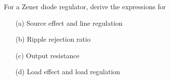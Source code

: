 
\begin{example}\label{exam2.34}
For a Zener diode regulator, derive the expressions for
\begin{itemize}
\itemsep=0pt
\item[(a)] Source effect and line regulation

\item[(b)] Ripple rejection ratio

\item[(c)] Output resistance

\item[(d)] Load effect and load regulation
\end{itemize}
\end{example}

